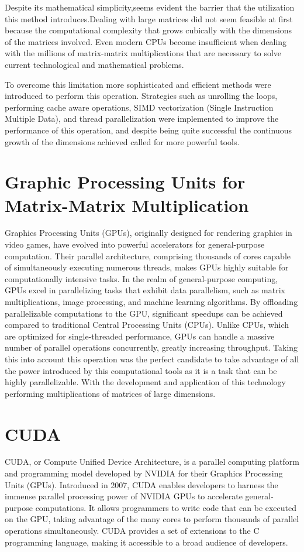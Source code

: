 \documentclass[12p,english]{article}
\begin{document}
Despite its mathematical simplicity,seems evident the barrier that the utilization this method introduces.Dealing with large matrices did not seem feasible at first because the computational complexity that grows cubically with the dimensions of the matrices involved. Even modern CPUs become insufficient when dealing with the millions of matrix-matrix multiplications that are necessary to solve current technological and mathematical problems. 

To overcome this limitation more sophisticated and efficient methods were introduced to perform this operation. Strategies such as unrolling the loops, performing cache aware operations, SIMD vectorization (Single Instruction Multiple Data), and thread parallelization were implemented to improve the performance of this operation, and despite being quite successful the continuous growth of the dimensions achieved called for more powerful tools. 

\section{Graphic Processing Units for Matrix-Matrix Multiplication}
Graphics Processing Units (GPUs), originally designed for rendering graphics in video games, have evolved into powerful accelerators for general-purpose computation. Their parallel architecture, comprising thousands of cores capable of simultaneously executing numerous threads, makes GPUs highly suitable for computationally intensive tasks. In the realm of general-purpose computing, GPUs excel in parallelizing tasks that exhibit data parallelism, such as matrix multiplications, image processing, and machine learning algorithms. By offloading parallelizable computations to the GPU, significant speedups can be achieved compared to traditional Central Processing Units (CPUs). Unlike CPUs, which are optimized for single-threaded performance, GPUs can handle a massive number of parallel operations concurrently, greatly increasing throughput. 
Taking this into account this operation was the perfect candidate to take advantage of all the power introduced by this computational tools as it is a task that can be highly parallelizable. With the development and application of this technology performing multiplications of matrices of large dimensions.

\section{CUDA}
CUDA, or Compute Unified Device Architecture, is a parallel computing platform and programming model developed by NVIDIA for their Graphics Processing Units (GPUs). Introduced in 2007, CUDA enables developers to harness the immense parallel processing power of NVIDIA GPUs to accelerate general-purpose computations. It allows programmers to write code that can be executed on the GPU, taking advantage of the many cores to perform thousands of parallel operations simultaneously. CUDA provides a set of extensions to the C programming language, making it accessible to a broad audience of developers.
\end{document}
